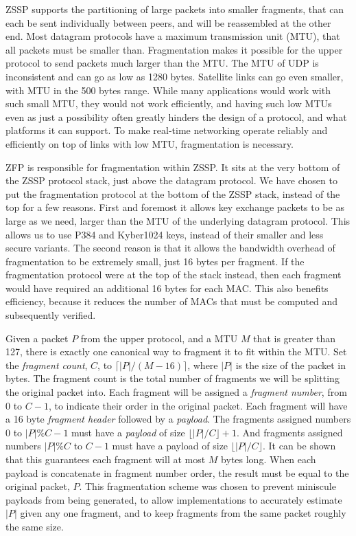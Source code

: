 \documentclass{article}
\begin{document}
ZSSP supports the partitioning of large packets into smaller fragments, that can each be sent individually between peers, and will be reassembled at the other end. Most datagram protocols have a maximum transmission unit (MTU), that all packets must be smaller than. Fragmentation makes it possible for the upper protocol to send packets much larger than the MTU. The MTU of UDP is inconsistent and can go as low as 1280 bytes. Satellite links can go even smaller, with MTU in the 500 bytes range. While many applications would work with such small MTU, they would not work efficiently, and having such low MTUs even as just a possibility often greatly hinders the design of a protocol, and what platforms it can support. To make real-time networking operate reliably and efficiently on top of links with low MTU, fragmentation is necessary.

ZFP is responsible for fragmentation within ZSSP. It sits at the very bottom of the ZSSP protocol stack, just above the datagram protocol. We have chosen to put the fragmentation protocol at the bottom of the ZSSP stack, instead of the top for a few reasons. First and foremost it allows key exchange packets to be as large as we need, larger than the MTU of the underlying datagram protocol. This allows us to use P384 and Kyber1024 keys, instead of their smaller and less secure variants. The second reason is that it allows the bandwidth overhead of fragmentation to be extremely small, just 16 bytes per fragment. If the fragmentation protocol were at the top of the stack instead, then each fragment would have required an additional 16 bytes for each MAC. This also benefits efficiency, because it reduces the number of MACs that must be computed and subsequently verified.

Given a packet $P$ from the upper protocol, and a MTU $M$ that is greater than 127, there is exactly one canonical way to fragment it to fit within the MTU. Set the \emph{fragment count}, $C$, to $\lceil|P|/(M - 16)\rceil$, where $|P|$ is the size of the packet in bytes. The fragment count is the total number of fragments we will be splitting the original packet into.  Each fragment will be assigned a \emph{fragment number}, from $0$ to $C - 1$, to indicate their order in the original packet. Each fragment will have a 16 byte \emph{fragment header} followed by a \emph{payload}. The fragments assigned numbers 0 to $|P|\%C - 1$ must have a \emph{payload} of size $\lfloor|P|/C\rfloor + 1$. And fragments assigned numbers $|P|\%C$ to $C - 1$ must have a payload of size $\lfloor|P|/C\rfloor$. It can be shown that this guarantees each fragment will at most $M$ bytes long. When each payload is concatenate in fragment number order, the result must be equal to the original packet, $P$. This fragmentation scheme was chosen to prevent miniscule payloads from being generated, to allow implementations to accurately estimate $|P|$ given any one fragment, and to keep fragments from the same packet roughly the same size.
\end{document}
